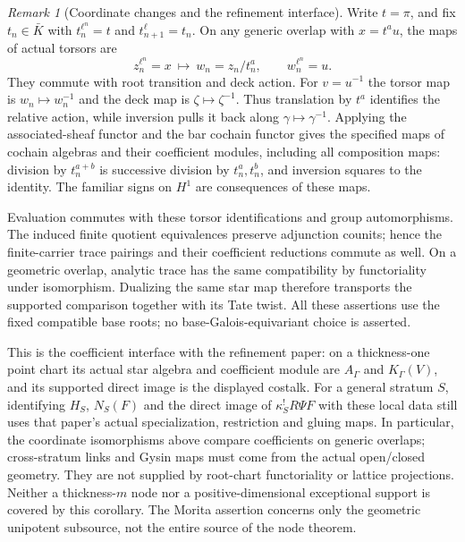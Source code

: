 \documentclass[11pt]{article}
\theoremstyle{definition}
\theoremstyle{remark}
\newtheorem{remark}[theorem]{Remark}
\begin{document}
\begin{remark}[Coordinate changes and the refinement interface]
\label{rem:frag-refinement-coordinate-interface}
Write $t=\pi$, and fix $t_n\in\bar K$ with
$t_n^{\ell^n}=t$ and $t_{n+1}^{\ell}=t_n$.
On any generic overlap with $x=t^a u$, the maps of actual torsors are
\[
 z_n^{\ell^n}=x\ \longmapsto\ w_n=z_n/t_n^a,
 \qquad w_n^{\ell^n}=u.
\]
They commute with root transition and deck action.  For $v=u^{-1}$
the torsor map is $w_n\mapsto w_n^{-1}$ and the deck map is
$\zeta\mapsto\zeta^{-1}$.  Thus translation by $t^a$ identifies the
relative action, while inversion pulls it back along
$\gamma\mapsto\gamma^{-1}$.  Applying the associated-sheaf functor
and the bar cochain functor gives the specified maps of cochain
algebras and their coefficient modules, including all composition
maps: division by $t_n^{a+b}$ is successive division by $t_n^a,t_n^b$,
and inversion squares to the identity.  The familiar signs on
$H^1$ are consequences of these maps.

Evaluation commutes with these torsor identifications and group
automorphisms.  The induced finite quotient equivalences preserve
adjunction counits; hence the finite-carrier trace pairings and their
coefficient reductions commute as well.  On a geometric overlap,
analytic trace has the same compatibility by functoriality under
isomorphism.  Dualizing the same star map therefore transports the
supported comparison together with its Tate twist.  All these assertions use the
fixed compatible base roots; no base-Galois-equivariant choice is
asserted.

This is the coefficient interface with the refinement paper: on a
thickness-one point chart its actual star algebra and coefficient
module are $A_\Gamma$ and $K_\Gamma(V)$, and its supported direct image
is the displayed costalk.  For a general stratum $S$, identifying
$H_S$, $N_S(F)$ and the direct image of $\kappa_S^!R\Psi F$ with
these local data still uses that paper's actual specialization,
restriction and gluing maps.  In particular, the coordinate isomorphisms
above compare coefficients on generic overlaps; cross-stratum links
and Gysin maps must come from the actual open/closed geometry.
They are not supplied by root-chart functoriality or lattice projections.
Neither a thickness-$m$ node nor a
positive-dimensional exceptional support is covered by this
corollary.  The Morita assertion concerns only the geometric
unipotent subsource, not the entire source of the node theorem.
\end{remark}
\end{document}
